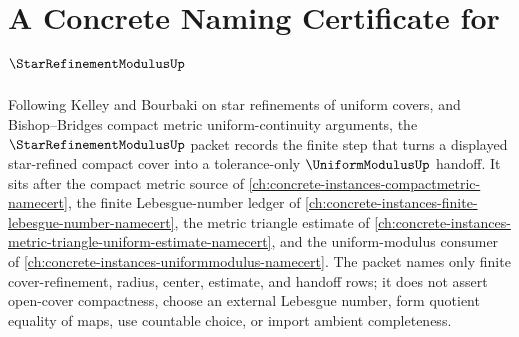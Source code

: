 \chapter{A Concrete Naming Certificate for $\StarRefinementModulusUp$}
\label{ch:concrete-instances-star-refinement-modulus-namecert}

Following Kelley and Bourbaki on star refinements of uniform covers, and Bishop--Bridges compact metric uniform-continuity arguments, the $\StarRefinementModulusUp$ packet records the finite step that turns a displayed star-refined compact cover into a tolerance-only $\UniformModulusUp$ handoff. It sits after the compact metric source of \autoref{ch:concrete-instances-compactmetric-namecert}, the finite Lebesgue-number ledger of \autoref{ch:concrete-instances-finite-lebesgue-number-namecert}, the metric triangle estimate of \autoref{ch:concrete-instances-metric-triangle-uniform-estimate-namecert}, and the uniform-modulus consumer of \autoref{ch:concrete-instances-uniformmodulus-namecert}. The packet names only finite cover-refinement, radius, center, estimate, and handoff rows; it does not assert open-cover compactness, choose an external Lebesgue number, form quotient equality of maps, use countable choice, or import ambient completeness.

